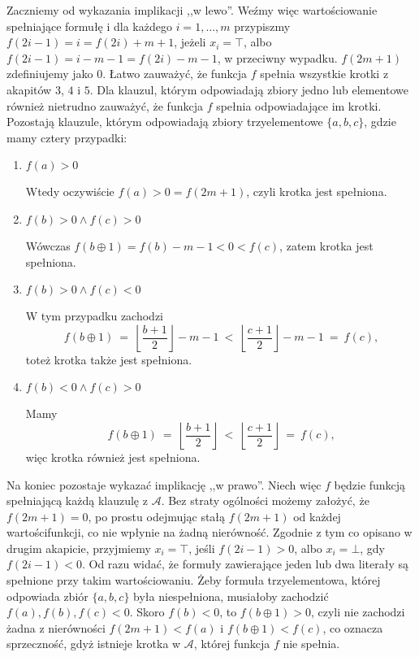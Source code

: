 \documentclass[12pt]{article}
\begin{document}
	Zaczniemy od wykazania implikacji ,,w lewo''. Weźmy więc wartościowanie
	spełniające formułę i dla każdego \(i = 1, \ldots, m\) przypiszmy \(f(2i -
	1) = i = f(2i) + m + 1\), jeżeli \(x_{i} = \top\), albo \(f(2i - 1) = i - m
	- 1 = f(2i) - m - 1\), w przeciwny wypadku. \(f(2m + 1)\) zdefiniujemy jako
	\(0\). Łatwo zauważyć, że funkcja \(f\) spełnia wszystkie krotki z akapitów
	\(3\), \(4\) i \(5\). Dla klauzul, którym odpowiadają zbiory jedno lub
	elementowe również nietrudno zauważyć, że funkcja \(f\) spełnia
	odpowiadające im krotki. Pozostają klauzule, którym odpowiadają zbiory
	trzyelementowe \(\{a, b, c\}\), gdzie mamy cztery przypadki:
	\begin{enumerate}
		\item \(f(a) > 0\)
		
		Wtedy oczywiście \(f(a) > 0 = f(2m + 1)\), czyli krotka jest spełniona.
		
		\item \(f(b) > 0 \wedge f(c) > 0\)
		
		Wówczas \(f(b \oplus 1) = f(b) - m - 1 < 0 < f(c)\), zatem krotka jest
		spełniona.
		
		\item \(f(b) > 0 \wedge f(c) < 0\)
		
		W tym przypadku zachodzi
		\[ f(b \oplus 1) \ = \ \left\lfloor \frac{b + 1}{2} \right\rfloor - m -
		1 \ < \ \left\lfloor \frac{c + 1}{2} \right\rfloor - m - 1 \ = \ f(c)
		\text{,} \]
		toteż krotka także jest spełniona.
		
		\item \(f(b) < 0 \wedge f(c) > 0\)
		
		Mamy
		\[ f(b \oplus 1) \ = \ \left\lfloor \frac{b + 1}{2} \right\rfloor \ < \
		\left\lfloor \frac{c + 1}{2} \right\rfloor \ = \ f(c) \text{,} \]
		więc krotka również jest spełniona.
	\end{enumerate}
	
	\medskip
	
	Na koniec pozostaje wykazać implikację ,,w prawo''. Niech więc \(f\) będzie
	funkcją spełniającą każdą klauzulę z \(\mathcal{A}\). Bez straty ogólności
	możemy założyć, że \(f(2m + 1) = 0\), po prostu odejmując stałą \(f(2m +
	1)\) od każdej wartościfunkcji, co nie wpłynie na żadną nierówność. Zgodnie
	z tym co opisano w drugim akapicie, przyjmiemy \(x_{i} = \top\), jeśli
	\(f(2i - 1) > 0\), albo \(x_{i} = \bot\), gdy \(f(2i - 1) < 0\). Od razu
	widać, że formuły zawierające jeden lub dwa literały są spełnione przy takim
	wartościowaniu. Żeby formuła trzyelementowa, której odpowiada zbiór \(\{a,
	b, c\}\) była niespełniona, musiałoby zachodzić \(f(a), f(b), f(c) < 0\).
	Skoro \(f(b) < 0\), to \(f(b \oplus 1) > 0\), czyli nie zachodzi żadna z
	nierówności \(f(2m + 1) < f(a)\) i \(f(b \oplus 1) < f(c)\), co oznacza
	sprzeczność, gdyż istnieje krotka w \(\mathcal{A}\), której funkcja \(f\)
	nie spełnia.
\end{document}
